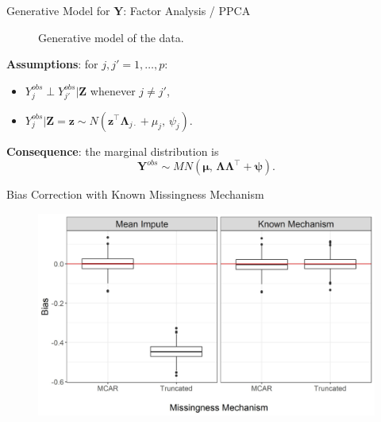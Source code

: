 \documentclass[aspectratio=169,xcolor=dvipsnames]{beamer}
\begin{document}
\begin{frame}{Generative Model for $\bm Y$: Factor Analysis / PPCA}
\noindent\begin{minipage}[t]{0.48\linewidth}
    \begin{figure}
    \caption{Generative model of the data.}
    \end{figure}
\end{minipage}
\fontsize{10pt}{10}\selectfont
\noindent\begin{minipage}[t]{0.48\linewidth}
\vspace{1cm}
\noindent \textbf{Assumptions}: for $j, j' =1, \dots, p$:
\vspace{.5cm}
\begin{itemize}
    \item $Y_j^{obs} \perp Y_{j'}^{obs}|\boldsymbol Z$ whenever $j\neq j'$,
    \item $Y_j^{obs}|\boldsymbol Z = \boldsymbol z \sim N(\boldsymbol z^\top \boldsymbol \Lambda_{j\cdot} + \mu_j,\, \psi_j)$.
\end{itemize}
\vspace{1cm}
\textbf{Consequence}: the marginal distribution is
    $$\boldsymbol Y^{obs} \sim MN(\boldsymbol \mu,\, \boldsymbol \Lambda \boldsymbol \Lambda^\top  + \boldsymbol \psi).$$
\end{minipage}
\end{frame}

\begin{frame}{Bias Correction with Known Missingness Mechanism}
    \begin{figure}
        \centering
        \includegraphics[width=.75\textwidth]{images/plot_bias_2.jpg}
    \end{figure}
\end{frame}
\end{document}
